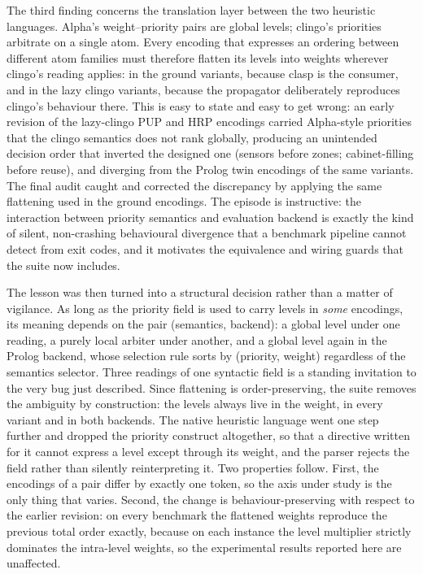 The third finding concerns the translation layer between the two heuristic languages. Alpha's weight--priority pairs are global levels; clingo's priorities arbitrate on a single atom. Every encoding that expresses an ordering between different atom families must therefore flatten its levels into weights wherever clingo's reading applies: in the ground variants, because clasp is the consumer, and in the lazy clingo variants, because the propagator deliberately reproduces clingo's behaviour there. This is easy to state and easy to get wrong: an early revision of the lazy-clingo PUP and HRP encodings carried Alpha-style priorities that the clingo semantics does not rank globally, producing an unintended decision order that inverted the designed one (sensors before zones; cabinet-filling before reuse), and diverging from the Prolog twin encodings of the same variants. The final audit caught and corrected the discrepancy by applying the same flattening used in the ground encodings. The episode is instructive: the interaction between priority semantics and evaluation backend is exactly the kind of silent, non-crashing behavioural divergence that a benchmark pipeline cannot detect from exit codes, and it motivates the equivalence and wiring guards that the suite now includes.

The lesson was then turned into a structural decision rather than a matter of vigilance. As long as the priority field is used to carry levels in \emph{some} encodings, its meaning depends on the pair (semantics, backend): a global level under one reading, a purely local arbiter under another, and a global level again in the Prolog backend, whose selection rule sorts by (priority, weight) regardless of the semantics selector. Three readings of one syntactic field is a standing invitation to the very bug just described. Since flattening is order-preserving, the suite removes the ambiguity by construction: the levels always live in the weight, in every variant and in both backends. The native heuristic language went one step further and dropped the priority construct altogether, so that a directive written for it cannot express a level except through its weight, and the parser rejects the field rather than silently reinterpreting it. Two properties follow. First, the encodings of a pair differ by exactly one token, so the axis under study is the only thing that varies. Second, the change is behaviour-preserving with respect to the earlier revision: on every benchmark the flattened weights reproduce the previous total order exactly, because on each instance the level multiplier strictly dominates the intra-level weights, so the experimental results reported here are unaffected.


